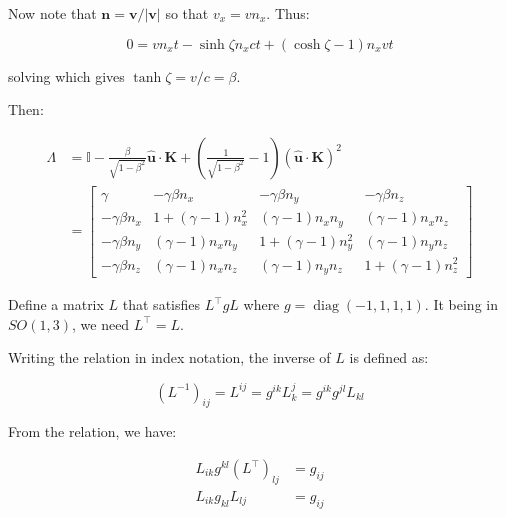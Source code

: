 \documentclass[12pt]{article}
\begin{document}
Now note that $\mathbf{n} = \mathbf{v}/\left\lvert \mathbf{v} \right\rvert$ so that $v_{x} = v n_{x}$. Thus:

\begin{equation}
    0 = v n_{x} t - \sinh{\zeta} n_{x} ct + (\cosh{\zeta} - 1) n_{x} v t
\end{equation}

solving which gives $\tanh{\zeta} = v/c = \beta$.

Then:

\begin{equation}
    \begin{split}
        \Lambda &= \mathbb{I} - \frac{\beta}{\sqrt{1 - \beta^{2}}} \hat{\mathbf{u}} \cdot \mathbf{K} + \left( \frac{1}{\sqrt{1 - \beta^{2}}} - 1 \right) (\hat{\mathbf{u}} \cdot \mathbf{K})^{2} \\
        &=
        \begin{bmatrix}
            \gamma              & -\gamma \beta n_{x}        & -\gamma \beta n_{y}        & -\gamma \beta n_{z}        \\
            -\gamma \beta n_{x} & 1 + (\gamma - 1) n_{x}^{2} & (\gamma - 1) n_{x} n_{y}   & (\gamma - 1) n_{x} n_{z}   \\
            -\gamma \beta n_{y} & (\gamma - 1) n_{x} n_{y}   & 1 + (\gamma - 1) n_{y}^{2} & (\gamma - 1) n_{y} n_{z}   \\
            -\gamma \beta n_{z} & (\gamma - 1) n_{x} n_{z}   & (\gamma - 1) n_{y} n_{z}   & 1 + (\gamma - 1) n_{z}^{2}
        \end{bmatrix}
    \end{split}
\end{equation}




Define a matrix $L$ that satisfies $L^{\intercal}gL$ where $g = \operatorname{diag}{(-1, 1, 1, 1)}$. It being in $SO(1, 3)$, we need $L^{\intercal} = L$.


Writing the relation in index notation, the inverse of $L$ is defined as:

\begin{equation}
    (L^{-1})_{ij} = L^{ij} = g^{ik}L_{k}^{j} = g^{ik}g^{jl}L_{kl}
\end{equation}

From the relation, we have:

\begin{equation}
    \begin{split}
        L_{ik}g^{kl}(L^{\intercal})_{lj} &= g_{ij} \\
        L_{ik}g_{kl}L_{lj} &= g_{ij}
    \end{split}
\end{equation}
\end{document}
